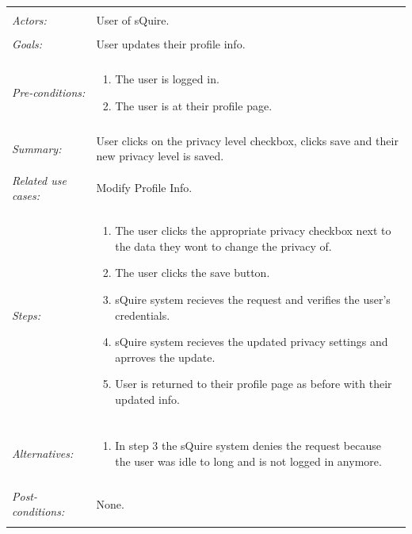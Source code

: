 \documentclass[11pt]{report}
\begin{document}
\begin{tabular}{ p{2cm} p{12cm} }
 \hline
 \\
 \textit{Actors:} & User of sQuire. \\ 
 \\
 \textit{Goals:} & User updates their profile info. \\
 \\
 \textit{Pre-conditions:} & \begin{enumerate}
  \item The user is logged in.
  \item The user is at their profile page.
 \end{enumerate} \\
 \\
 \textit{Summary:} & User clicks on the privacy level checkbox, clicks save and their new privacy level is saved.\\ 
 \\
 \textit{Related use cases:} & Modify Profile Info. \\ 
 \\
 \textit{Steps:} & \begin{enumerate}
  \item The user clicks the appropriate privacy checkbox next to the data they wont to change the privacy of.
  \item The user clicks the save button.
  \item sQuire system recieves the request and verifies the user's credentials.
  \item sQuire system recieves the updated privacy settings and aprroves the update.
  \item User is returned to their profile page as before with their updated info.
 \end{enumerate} \\
 \\
 \textit{Alternatives:} & \begin{enumerate} 
  \item In step 3 the sQuire system denies the request because the user was idle to long and is not logged in anymore.
 \end{enumerate} \\
 \\
 \textit{Post-conditions:} & None. \\
 \\
\hline
\end{tabular}
\end{document}
